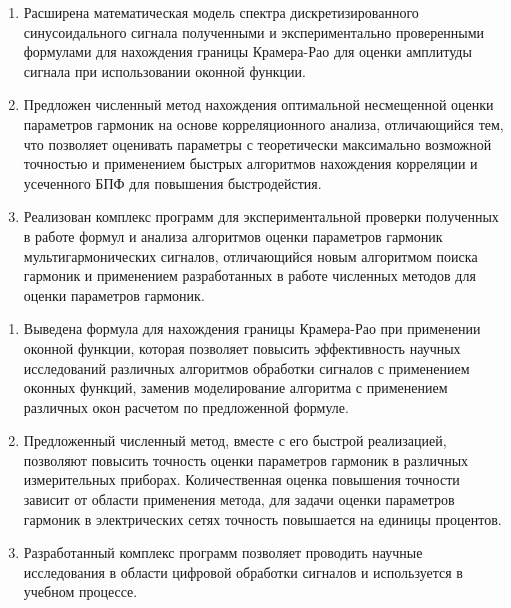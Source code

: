 {\novelty}
 
\begin{enumerate}
\item Расширена математическая модель спектра дискретизированного синусоидального сигнала полученными и экспериментально проверенными формулами для нахождения границы Крамера-Рао для оценки амплитуды сигнала при использовании оконной функции.

\item Предложен численный метод нахождения оптимальной несмещенной оценки параметров гармоник на основе корреляционного анализа, отличающийся тем, что позволяет оценивать параметры с теоретически максимально возможной точностью и применением быстрых алгоритмов нахождения корреляции и усеченного БПФ для повышения быстродейстия.

\item Реализован комплекс программ для экспериментальной проверки полученных в работе формул и анализа алгоритмов оценки параметров гармоник мультигармонических сигналов, отличающийся новым алгоритмом поиска гармоник и применением разработанных в работе численных методов для оценки параметров гармоник.
\end{enumerate}

{\influence} 

\begin{enumerate}
\item Выведена формула для нахождения границы Крамера-Рао при применении оконной функции, которая позволяет повысить эффективность научных исследований различных алгоритмов обработки сигналов с применением оконных функций, заменив моделирование алгоритма с применением различных окон расчетом по предложенной формуле.

\item Предложенный численный метод, вместе с его быстрой реализацией, позволяют повысить точность оценки параметров гармоник в различных измерительных приборах. Количественная оценка повышения точности зависит от области применения метода, для задачи оценки параметров гармоник в электрических сетях точность повышается на единицы процентов.

\item Разработанный комплекс программ позволяет проводить научные исследования в области цифровой обработки сигналов и используется в учебном процессе.
\end{enumerate}

